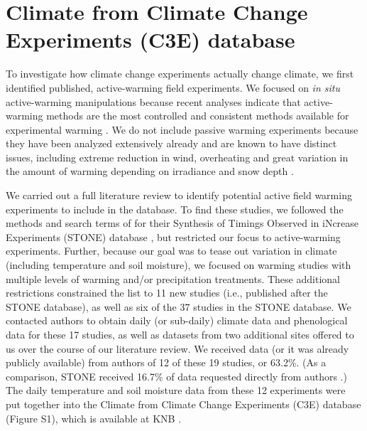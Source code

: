 \documentclass{article}
\begin{document}
\section* {Climate from Climate Change Experiments (C3E) database}
\par To investigate how climate change experiments actually change climate, we first identified published, active-warming field experiments. We focused on \textit{in situ} active-warming manipulations because recent analyses indicate that active-warming methods are the most controlled and consistent methods available for experimental warming \citep{kimball2005,kimball2008,aronson2009,wolkovich2012}. We do not include passive warming experiments because they have been analyzed extensively already and are known to have distinct issues, including extreme reduction in wind, overheating and great variation in the amount of warming depending on irradiance and snow depth \citep{marion1997,shaver2000,wolkovich2012,bokhorst2013}.
\par We carried out a full literature review to identify potential active field warming experiments to include in the database. To find these studies, we followed the methods and search terms of \citet{wolkovich2012} for their Synthesis of Timings Observed in iNcrease Experiments (STONE) database \citep{wolkovich2012}, but restricted our focus to active-warming experiments. Further, because our goal was to tease out variation in climate (including temperature and soil moisture), we focused on warming studies with multiple levels of warming and/or precipitation treatments. These additional restrictions constrained the list to 11 new studies (i.e., published after the STONE database), as well as six of the 37 studies in the STONE database. We contacted authors to obtain daily (or sub-daily) climate data and phenological data for these 17 studies, as well as datasets from two additional sites offered to us over the course of our literature review.  We received data (or it was already publicly available) from authors of 12 of these 19 studies, or 63.2\%. (As a comparison, STONE received 16.7\% of data requested directly from authors \citep{wolkovich2012}.) 
The daily temperature and soil moisture data from these 12 experiments were put together into the Climate from Climate Change Experiments (C3E) database (Figure S1), which is available at KNB \citep{ettinger2017}.%
\end{document}
